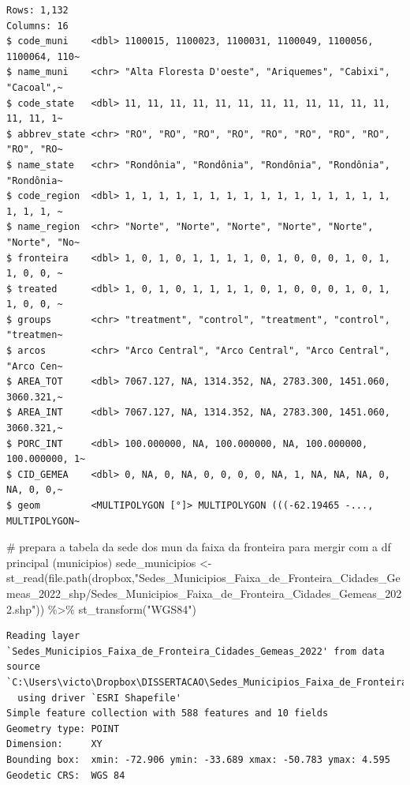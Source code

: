 \documentclass[
  letterpaper,
  DIV=11,
  numbers=noendperiod]{scrartcl}
\newenvironment{Shaded}{\begin{snugshade}}{\end{snugshade}}
\newcommand{\CommentTok}[1]{\textcolor[rgb]{0.37,0.37,0.37}{#1}}
\newcommand{\FunctionTok}[1]{\textcolor[rgb]{0.28,0.35,0.67}{#1}}
\newcommand{\NormalTok}[1]{\textcolor[rgb]{0.00,0.23,0.31}{#1}}
\newcommand{\OtherTok}[1]{\textcolor[rgb]{0.00,0.23,0.31}{#1}}
\newcommand{\SpecialCharTok}[1]{\textcolor[rgb]{0.37,0.37,0.37}{#1}}
\newcommand{\StringTok}[1]{\textcolor[rgb]{0.13,0.47,0.30}{#1}}
\begin{document}
\begin{verbatim}
Rows: 1,132
Columns: 16
$ code_muni    <dbl> 1100015, 1100023, 1100031, 1100049, 1100056, 1100064, 110~
$ name_muni    <chr> "Alta Floresta D'oeste", "Ariquemes", "Cabixi", "Cacoal",~
$ code_state   <dbl> 11, 11, 11, 11, 11, 11, 11, 11, 11, 11, 11, 11, 11, 11, 1~
$ abbrev_state <chr> "RO", "RO", "RO", "RO", "RO", "RO", "RO", "RO", "RO", "RO~
$ name_state   <chr> "Rondônia", "Rondônia", "Rondônia", "Rondônia", "Rondônia~
$ code_region  <dbl> 1, 1, 1, 1, 1, 1, 1, 1, 1, 1, 1, 1, 1, 1, 1, 1, 1, 1, 1, ~
$ name_region  <chr> "Norte", "Norte", "Norte", "Norte", "Norte", "Norte", "No~
$ fronteira    <dbl> 1, 0, 1, 0, 1, 1, 1, 1, 0, 1, 0, 0, 0, 1, 0, 1, 1, 0, 0, ~
$ treated      <dbl> 1, 0, 1, 0, 1, 1, 1, 1, 0, 1, 0, 0, 0, 1, 0, 1, 1, 0, 0, ~
$ groups       <chr> "treatment", "control", "treatment", "control", "treatmen~
$ arcos        <chr> "Arco Central", "Arco Central", "Arco Central", "Arco Cen~
$ AREA_TOT     <dbl> 7067.127, NA, 1314.352, NA, 2783.300, 1451.060, 3060.321,~
$ AREA_INT     <dbl> 7067.127, NA, 1314.352, NA, 2783.300, 1451.060, 3060.321,~
$ PORC_INT     <dbl> 100.000000, NA, 100.000000, NA, 100.000000, 100.000000, 1~
$ CID_GEMEA    <dbl> 0, NA, 0, NA, 0, 0, 0, 0, NA, 1, NA, NA, NA, 0, NA, 0, 0,~
$ geom         <MULTIPOLYGON [°]> MULTIPOLYGON (((-62.19465 -..., MULTIPOLYGON~
\end{verbatim}

\begin{Shaded}
\begin{Highlighting}[]
\CommentTok{\# prepara a tabela da sede dos mun da faixa da fronteira para mergir com a df principal (municipios)}
\NormalTok{sede\_municipios }\OtherTok{\textless{}{-}} \FunctionTok{st\_read}\NormalTok{(}\FunctionTok{file.path}\NormalTok{(dropbox,}\StringTok{"Sedes\_Municipios\_Faixa\_de\_Fronteira\_Cidades\_Gemeas\_2022\_shp/Sedes\_Municipios\_Faixa\_de\_Fronteira\_Cidades\_Gemeas\_2022.shp"}\NormalTok{)) }\SpecialCharTok{\%\textgreater{}\%}
  \FunctionTok{st\_transform}\NormalTok{(}\StringTok{"WGS84"}\NormalTok{)}
\end{Highlighting}
\end{Shaded}

\begin{verbatim}
Reading layer `Sedes_Municipios_Faixa_de_Fronteira_Cidades_Gemeas_2022' from data source `C:\Users\victo\Dropbox\DISSERTACAO\Sedes_Municipios_Faixa_de_Fronteira_Cidades_Gemeas_2022_shp\Sedes_Municipios_Faixa_de_Fronteira_Cidades_Gemeas_2022.shp' 
  using driver `ESRI Shapefile'
Simple feature collection with 588 features and 10 fields
Geometry type: POINT
Dimension:     XY
Bounding box:  xmin: -72.906 ymin: -33.689 xmax: -50.783 ymax: 4.595
Geodetic CRS:  WGS 84
\end{verbatim}
\end{document}
